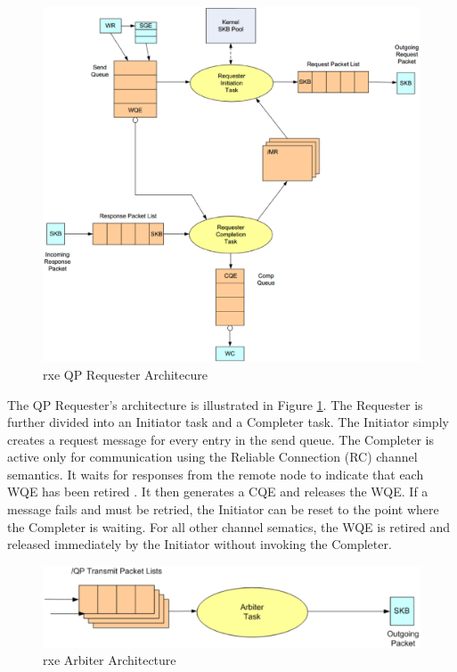 \documentclass[11pt]{book}
\begin{document}
\begin{figure}
\includegraphics[width=\textwidth]{rxe_req}
\caption{rxe QP Requester Architecure \protect\cite{pearson-10}}\label{rxe-req} 
\end{figure}

The QP Requester's architecture is illustrated in Figure \ref{rxe-req}.  The Requester is
further divided into an Initiator task and a Completer task.  The Initiator simply creates
a request message for every entry in the send queue.  The Completer is active only for
communication using the Reliable Connection (RC) channel semantics.  It waits for
responses from the remote node to indicate that each WQE has been retired \cite
{pearson-10}. It then generates a CQE and releases the WQE. If a message fails and must be
retried, the Initiator can be reset to the point where the Completer is waiting.  For all
other channel sematics, the WQE is retired and released immediately by the Initiator
without invoking the Completer.

\begin{figure}
\includegraphics[width=\textwidth]{rxe_arbiter}
\caption{rxe Arbiter Architecture \protect\cite{pearson-10}}\label{rxe-arbiter}
\end{figure}
\end{document}
